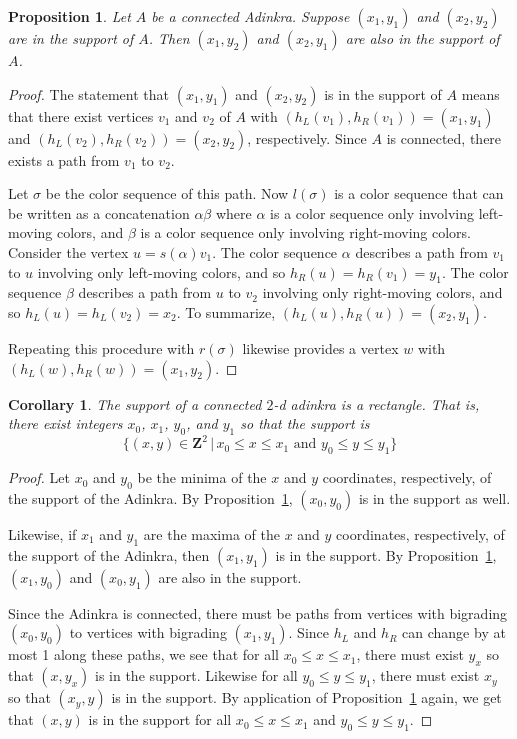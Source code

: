 \documentclass[12pt,twoside,singlespace]{article}
\numberwithin{equation}{section}
\newtheorem{cor}[equation]{Corollary}
\newtheorem{prop}[equation]{Proposition}
\theoremstyle{definition}
\newcommand{\ZZ}{\mathbf{Z}}
\begin{document}
\begin{prop}
\label{prop:rectangle-completion}
Let $A$ be a connected Adinkra.  Suppose $(x_1,y_1)$ and $(x_2,y_2)$ are in the support of $A$.  Then $(x_1,y_2)$ and $(x_2,y_1)$ are also in the support of $A$.
\end{prop}
\begin{proof}
The statement that $(x_1,y_1)$ and $(x_2,y_2)$ is in the support of $A$ means that there exist vertices $v_1$ and $v_2$ of $A$ with $(h_L(v_1),h_R(v_1))=(x_1,y_1)$ and $(h_L(v_2),h_R(v_2))=(x_2,y_2)$, respectively.  Since $A$ is connected, there exists a path from $v_1$ to $v_2$.

Let $\sigma$ be the color sequence of this path.  Now $l(\sigma)$ is a color sequence that can be written as a concatenation $\alpha\beta$ where $\alpha$ is a color sequence only involving left-moving colors, and $\beta$ is a color sequence only involving right-moving colors.  Consider the vertex $u=s(\alpha)v_1$.  The color sequence $\alpha$ describes a path from $v_1$ to $u$ involving only left-moving colors, and so $h_R(u)=h_R(v_1)=y_1$.  The color sequence $\beta$ describes a path from $u$ to $v_2$ involving only right-moving colors, and so $h_L(u)=h_L(v_2)=x_2$.  To summarize, $(h_L(u),h_R(u))=(x_2,y_1)$.

Repeating this procedure with $r(\sigma)$ likewise provides a vertex $w$ with $(h_L(w),h_R(w))=(x_1,y_2)$.
\end{proof}

\begin{cor}
\label{cor:rectangle}
The support of a connected $2$-d adinkra is a rectangle.  That is, there exist integers $x_0$, $x_1$, $y_0$, and $y_1$ so that the support is
\[\{(x,y)\in\ZZ^2\,|\,x_0\le x\le x_1\mbox{ and }y_0\le y\le y_1\}\]
\end{cor}
\begin{proof}
Let $x_0$ and $y_0$ be the minima of the $x$ and $y$ coordinates, respectively, of the support of the Adinkra.  By Proposition~\ref{prop:rectangle-completion}, $(x_0,y_0)$ is in the support as well.

Likewise, if $x_1$ and $y_1$ are the maxima of the $x$ and $y$ coordinates, respectively, of the support of the Adinkra, then $(x_1,y_1)$ is in the support.  By Proposition~\ref{prop:rectangle-completion}, $(x_1,y_0)$ and $(x_0,y_1)$ are also in the support.

Since the Adinkra is connected, there must be paths from vertices with bigrading $(x_0,y_0)$ to vertices with bigrading $(x_1,y_1)$.  Since $h_L$ and $h_R$ can change by at most 1 along these paths, we see that for all $x_0\le x\le x_1$, there must exist $y_x$ so that $(x,y_x)$ is in the support.  Likewise for all $y_0\le y\le y_1$, there must exist $x_y$ so that $(x_y,y)$ is in the support.  By application of Proposition~\ref{prop:rectangle-completion} again, we get that $(x,y)$ is in the support for all $x_0\le x\le x_1$ and $y_0\le y\le y_1$.
\end{proof}
\end{document}
